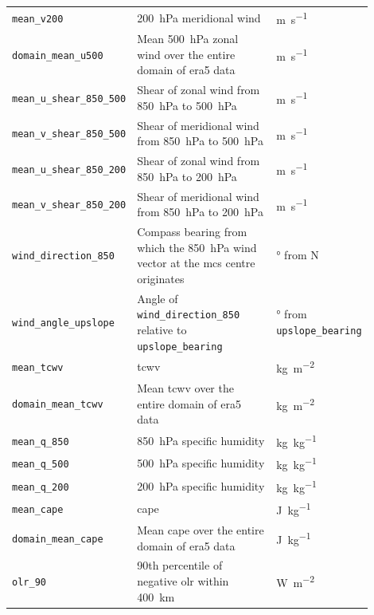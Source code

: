 {\begin{longtable}{>{\raggedright\arraybackslash}p{0.25\linewidth} p{0.50\linewidth} >{\raggedright\arraybackslash}p{0.15\linewidth}}
    \texttt{mean\_v200} & \SI{200}{\hecto\pascal} meridional wind & \unit{\meter\per\second} \\
    \texttt{domain\_mean\_u500} & Mean \SI{500}{\hecto\pascal} zonal wind over the entire domain of \acrshort{era5} data & \unit{\meter\per\second} \\
    \texttt{mean\_u\_shear\_850\_500} & Shear of zonal wind from \SI{850}{\hecto\pascal} to \SI{500}{\hecto\pascal} & \unit{\meter\per\second} \\
    \texttt{mean\_v\_shear\_850\_500} & Shear of meridional wind from \SI{850}{\hecto\pascal} to \SI{500}{\hecto\pascal} & \unit{\meter\per\second} \\
    \texttt{mean\_u\_shear\_850\_200} & Shear of zonal wind from \SI{850}{\hecto\pascal} to \SI{200}{\hecto\pascal} & \unit{\meter\per\second} \\
    \texttt{mean\_v\_shear\_850\_200} & Shear of meridional wind from \SI{850}{\hecto\pascal} to \SI{200}{\hecto\pascal} & \unit{\meter\per\second} \\
    \texttt{wind\_direction\_850} & Compass bearing from which the \SI{850}{\hecto\pascal} wind vector at the \acrshort{mcs} centre originates & \unit{\degree} from  N \\
    \texttt{wind\_angle\_upslope} & Angle of \texttt{wind\_direction\_850} relative to \texttt{upslope\_bearing} & \unit{\degree} from \texttt{upslope\_bearing} \\
    \texttt{mean\_tcwv} & \acrfull{tcwv} & \unit{\kilogram\per\meter\squared} \\
    \texttt{domain\_mean\_tcwv} & Mean \acrshort{tcwv} over the entire domain of \acrshort{era5} data & \unit{\kilogram\per\meter\squared} \\
    \texttt{mean\_q\_850} & \SI{850}{\hecto\pascal} specific humidity & \unit{\kilogram\per\kilogram} \\
    \texttt{mean\_q\_500} & \SI{500}{\hecto\pascal} specific humidity & \unit{\kilogram\per\kilogram} \\
    \texttt{mean\_q\_200} & \SI{200}{\hecto\pascal} specific humidity & \unit{\kilogram\per\kilogram} \\
    \texttt{mean\_cape} & \acrfull{cape} & \unit{\joule\per\kilogram} \\
    \texttt{domain\_mean\_cape} & Mean \acrshort{cape} over the entire domain of \acrshort{era5} data & \unit{\joule\per\kilogram} \\
    \texttt{olr\_90} & 90th percentile of negative \acrfull{olr} within \SI{400}{\km} & \unit{\watt\per\square\meter} \\

\end{longtable}}
